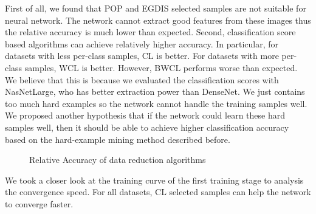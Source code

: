 First of all, we found that POP and EGDIS selected samples are not suitable for neural network. The network cannot extract good features from these images thus the relative accuracy is much lower than expected. Second, classification score based algorithms can achieve relatively higher accuracy. In particular, for datasets with less per-class samples, CL is better. For datasets with more per-class samples, WCL is better. However, BWCL performs worse  than expected. We believe that this is because we evaluated the classification scores with NasNetLarge, who has better extraction power than DenseNet. We just contains too much hard examples so the network cannot handle the training samples well. We proposed another hypothesis that if the network could learn these hard samples well, then it should be able to achieve higher classification accuracy based on the hard-example mining method described before. 

\begin{figure}[H]
\centering  
{}
\caption{Relative Accuracy of data reduction algorithms}
\label{Fig.logistic_relativeacc}
\end{figure}

We took a closer look at the training curve of the first training stage to analysis the convergence speed. For all datasets, CL selected samples can help the network to converge faster. 

